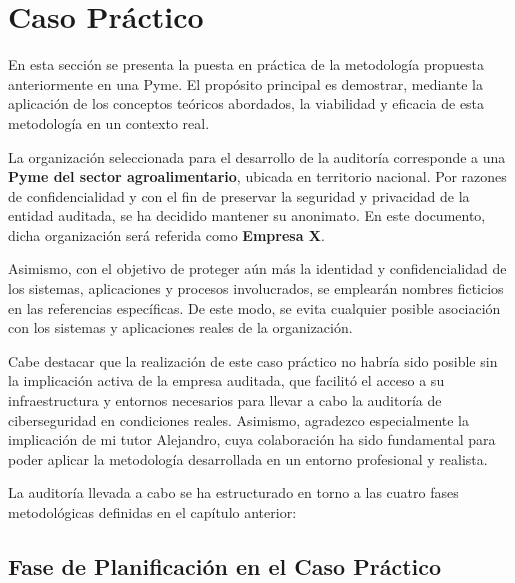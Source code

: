 \documentclass[a4paper, 11pt]{article}
\begin{document}
\clearpage
\thispagestyle{nohead}




\section{Caso Práctico}

En esta sección se presenta la puesta en práctica de la metodología propuesta anteriormente en una Pyme. El propósito principal es demostrar, mediante la aplicación de los conceptos teóricos abordados, la viabilidad y eficacia de esta metodología en un contexto real.



La organización seleccionada para el desarrollo de la auditoría corresponde a una \textbf{Pyme del sector agroalimentario}, ubicada en territorio nacional. Por razones de confidencialidad y con el fin de preservar la seguridad y privacidad de la entidad auditada, se ha decidido mantener su anonimato. En este documento, dicha organización será referida como \textbf{Empresa X}.



Asimismo, con el objetivo de proteger aún más la identidad y confidencialidad de los sistemas, aplicaciones y procesos involucrados, se emplearán nombres ficticios en las referencias específicas. De este modo, se evita cualquier posible asociación con los sistemas y aplicaciones reales de la organización.


Cabe destacar que la realización de este caso práctico no habría sido posible sin la implicación activa de la empresa auditada, que facilitó el acceso a su infraestructura y entornos necesarios para llevar a cabo la auditoría de ciberseguridad en condiciones reales. Asimismo, agradezco especialmente la implicación de mi tutor Alejandro, cuya colaboración ha sido fundamental para poder aplicar la metodología desarrollada en un entorno profesional y realista.



La auditoría llevada a cabo se ha estructurado en torno a las cuatro fases metodológicas definidas en el capítulo anterior:



\subsection{Fase de Planificación en el Caso Práctico}
\end{document}
